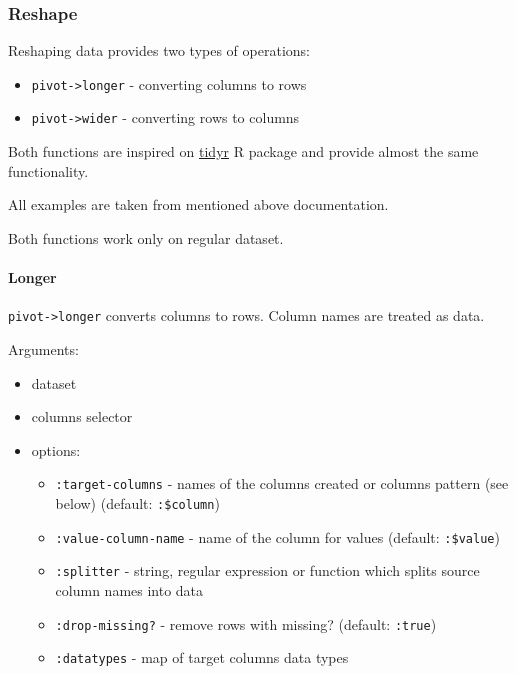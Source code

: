 \documentclass[]{article}
\providecommand{\tightlist}{%
  \setlength{\itemsep}{0pt}\setlength{\parskip}{0pt}}
\let\oldparagraph\paragraph
\renewcommand{\paragraph}[1]{\oldparagraph{#1}\mbox{}}
\begin{document}
\subsubsection{Reshape}\label{reshape}

Reshaping data provides two types of operations:

\begin{itemize}
\tightlist
\item
  \texttt{pivot-\textgreater{}longer} - converting columns to rows
\item
  \texttt{pivot-\textgreater{}wider} - converting rows to columns
\end{itemize}

Both functions are inspired on
\href{https://tidyr.tidyverse.org/articles/pivot.html}{tidyr} R package
and provide almost the same functionality.

All examples are taken from mentioned above documentation.

Both functions work only on regular dataset.

\paragraph{Longer}\label{longer}

\texttt{pivot-\textgreater{}longer} converts columns to rows. Column
names are treated as data.

Arguments:

\begin{itemize}
\tightlist
\item
  dataset
\item
  columns selector
\item
  options:

  \begin{itemize}
  \tightlist
  \item
    \texttt{:target-columns} - names of the columns created or columns
    pattern (see below) (default: \texttt{:\$column})
  \item
    \texttt{:value-column-name} - name of the column for values
    (default: \texttt{:\$value})
  \item
    \texttt{:splitter} - string, regular expression or function which
    splits source column names into data
  \item
    \texttt{:drop-missing?} - remove rows with missing? (default:
    \texttt{:true})
  \item
    \texttt{:datatypes} - map of target columns data types
  \end{itemize}
\end{itemize}
\end{document}
